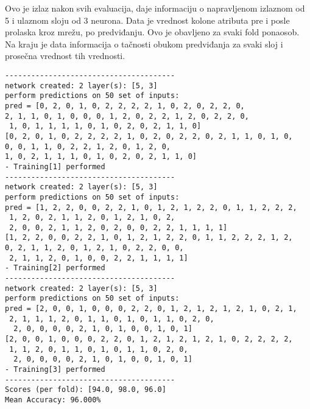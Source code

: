\documentclass[fontsize=11bp, paper=a4]{scrarticle}
\begin{document}
Ovo je izlaz nakon svih evaluacija, daje informaciju o napravljenom izlaznom od 5 i ulaznom sloju od 3 neurona. Data je vrednost kolone atributa pre i posle prolaska kroz mrežu, po predviđanju. Ovo je obavljeno za svaki fold ponaosob. Na kraju je data informacija o tačnosti obukom predviđanja za svaki sloj i prosečna vrednost tih vrednosti.
\begin{verbatim}
---------------------------------------
network created: 2 layer(s): [5, 3]
perform predictions on 50 set of inputs:
pred = [0, 2, 0, 1, 0, 2, 2, 2, 2, 1, 0, 2, 0, 2, 2, 0, 
2, 1, 1, 0, 1, 0, 0, 0, 1, 2, 0, 2, 2, 1, 2, 0, 2, 2, 0,
 1, 0, 1, 1, 1, 1, 0, 1, 0, 2, 0, 2, 1, 1, 0]
[0, 2, 0, 1, 0, 2, 2, 2, 2, 1, 0, 2, 0, 2, 2, 0, 2, 1, 1, 0, 1, 0, 
0, 0, 1, 1, 0, 2, 2, 1, 2, 0, 1, 2, 0, 
1, 0, 2, 1, 1, 1, 0, 1, 0, 2, 0, 2, 1, 1, 0]
- Training[1] performed
---------------------------------------
network created: 2 layer(s): [5, 3]
perform predictions on 50 set of inputs:
pred = [1, 2, 2, 0, 0, 2, 2, 1, 0, 1, 2, 1, 2, 2, 0, 1, 1, 2, 2, 2,
 1, 2, 0, 2, 1, 1, 2, 0, 1, 2, 1, 0, 2, 
 2, 0, 0, 2, 1, 1, 2, 0, 2, 0, 0, 2, 2, 1, 1, 1, 1]
[1, 2, 2, 0, 0, 2, 2, 1, 0, 1, 2, 1, 2, 2, 0, 1, 1, 2, 2, 2, 1, 2, 
0, 2, 1, 1, 2, 0, 1, 2, 1, 0, 2, 2, 0, 0,
 2, 1, 1, 2, 0, 1, 0, 0, 2, 2, 1, 1, 1, 1]
- Training[2] performed
---------------------------------------
network created: 2 layer(s): [5, 3]
perform predictions on 50 set of inputs:
pred = [2, 0, 0, 1, 0, 0, 0, 2, 2, 0, 1, 2, 1, 2, 1, 2, 1, 0, 2, 1,
 2, 1, 1, 1, 2, 0, 1, 1, 0, 1, 0, 1, 1, 0, 2, 0,
  2, 0, 0, 0, 0, 2, 1, 0, 1, 0, 0, 1, 0, 1]
[2, 0, 0, 1, 0, 0, 0, 2, 2, 0, 1, 2, 1, 2, 1, 2, 1, 0, 2, 2, 2, 2,
 1, 1, 2, 0, 1, 1, 0, 1, 0, 1, 1, 0, 2, 0,
  2, 0, 0, 0, 0, 2, 1, 0, 1, 0, 0, 1, 0, 1]
- Training[3] performed
---------------------------------------
Scores (per fold): [94.0, 98.0, 96.0]
Mean Accuracy: 96.000%
\end{verbatim}    



\end{document}
